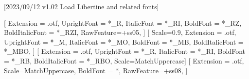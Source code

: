 
[2023/09/12 v1.02 Load Libertine and related fonts]

%
%
\ifpdftex
    \RequirePackage[T1]{fontenc}
    \RequirePackage{bm}%
\else
    \RequirePackage[warnings-off={mathtools-colon,mathtools-overbracket}]{unicode-math}
    \setmainfont{LinLibertine}[%
    	Extension = .otf,
    	UprightFont = *_R,
    	ItalicFont = *_RI,
    	BoldFont = *_RZ, %
    	BoldItalicFont = *_RZI, %
    	RawFeature={+ss05},%
        ]    
    \setmonofont{LinLibertine}[%
    	Scale=0.9,
	    Extension = .otf,
    	UprightFont = *_M,
    	ItalicFont = *_MO,%
    	BoldFont = *_MB,
	    BoldItalicFont = *_MBO,%
	]    
    \setsansfont{LinBiolinum}[%
    	Extension = .otf,
    	UprightFont = *_R,
    	ItalicFont = *_RI,
    	BoldFont = *_RB,
	    BoldItalicFont = *_RBO,%
    	Scale=MatchUppercase]
    [%
     	Extension = .otf,   
    	Scale=MatchUppercase,
		BoldFont = *,%
    	RawFeature={+ss08},%
    	]
    \newcommand*{\FRAC}[1]{{\addfontfeature{Fractions=On}#1}}%
\fi
